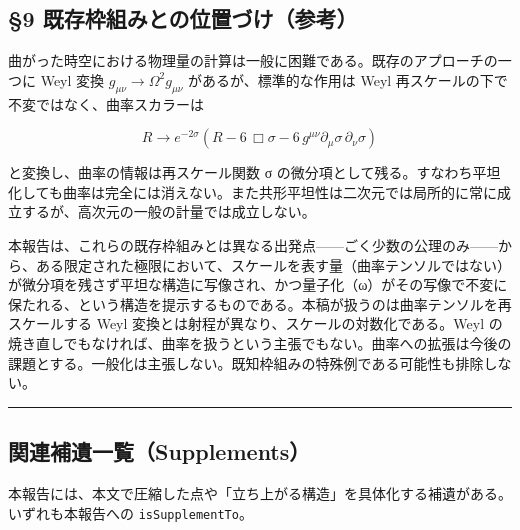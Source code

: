 \documentclass[11pt]{ltjsarticle}
\begin{document}
\subsection{§9
既存枠組みとの位置づけ（参考）}\label{ux65e2ux5b58ux67a0ux7d44ux307fux3068ux306eux4f4dux7f6eux3065ux3051ux53c2ux8003}

曲がった時空における物理量の計算は一般に困難である。既存のアプローチの一つに
Weyl 変換 \(g_{\mu\nu}\to\Omega^2 g_{\mu\nu}\) があるが、標準的な作用は
Weyl 再スケールの下で不変ではなく、曲率スカラーは

\[R \to e^{-2\sigma}\left(R - 6\,\Box\sigma - 6\,g^{\mu\nu}\partial_\mu\sigma\,\partial_\nu\sigma\right)\]

と変換し、曲率の情報は再スケール関数 σ
の微分項として残る。すなわち平坦化しても曲率は完全には消えない。また共形平坦性は二次元では局所的に常に成立するが、高次元の一般の計量では成立しない。

本報告は、これらの既存枠組みとは異なる出発点------ごく少数の公理のみ------から、ある限定された極限において、スケールを表す量（曲率テンソルではない）が微分項を残さず平坦な構造に写像され、かつ量子化（ω）がその写像で不変に保たれる、という構造を提示するものである。本稿が扱うのは曲率テンソルを再スケールする
Weyl 変換とは射程が異なり、スケールの対数化である。Weyl
の焼き直しでもなければ、曲率を扱うという主張でもない。曲率への拡張は今後の課題とする。一般化は主張しない。既知枠組みの特殊例である可能性も排除しない。

\begin{center}\rule{0.5\linewidth}{0.5pt}\end{center}

\subsection{関連補遺一覧（Supplements）}\label{ux95a2ux9023ux88dcux907aux4e00ux89a7supplements}

本報告には、本文で圧縮した点や「立ち上がる構造」を具体化する補遺がある。いずれも本報告への
\texttt{isSupplementTo}。
\end{document}
